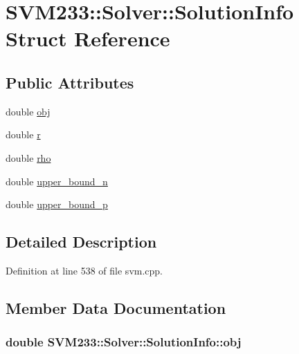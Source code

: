 \hypertarget{struct_s_v_m233_1_1_solver_1_1_solution_info}{}\section{S\+V\+M233\+:\+:Solver\+:\+:Solution\+Info Struct Reference}
\label{struct_s_v_m233_1_1_solver_1_1_solution_info}
\subsection*{Public Attributes}
\begin{DoxyCompactItemize}
\item 
double \hyperlink{struct_s_v_m233_1_1_solver_1_1_solution_info_ad694340f7d212ee41667c7f804acc2bd}{obj}
\item 
double \hyperlink{struct_s_v_m233_1_1_solver_1_1_solution_info_a933250d505eef75a0173e33dbccb8f51}{r}
\item 
double \hyperlink{struct_s_v_m233_1_1_solver_1_1_solution_info_a86d34f2d8c16158bcddb3a4638a4cc2f}{rho}
\item 
double \hyperlink{struct_s_v_m233_1_1_solver_1_1_solution_info_af558f84aa80ea9c97730c0cd0dca7ef9}{upper\+\_\+bound\+\_\+n}
\item 
double \hyperlink{struct_s_v_m233_1_1_solver_1_1_solution_info_a14db95d53a62445ec92ddea0b6ee17d4}{upper\+\_\+bound\+\_\+p}
\end{DoxyCompactItemize}


\subsection{Detailed Description}


Definition at line 538 of file svm.\+cpp.



\subsection{Member Data Documentation}
\subsubsection[{\texorpdfstring{obj}{obj}}]{\setlength{\rightskip}{0pt plus 5cm}double S\+V\+M233\+::\+Solver\+::\+Solution\+Info\+::obj}\hypertarget{struct_s_v_m233_1_1_solver_1_1_solution_info_ad694340f7d212ee41667c7f804acc2bd}{}\label{struct_s_v_m233_1_1_solver_1_1_solution_info_ad694340f7d212ee41667c7f804acc2bd}


